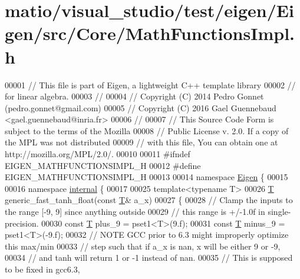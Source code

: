 \hypertarget{matio_2visual__studio_2test_2eigen_2_eigen_2src_2_core_2_math_functions_impl_8h_source}{}\section{matio/visual\+\_\+studio/test/eigen/\+Eigen/src/\+Core/\+Math\+Functions\+Impl.h}
\label{matio_2visual__studio_2test_2eigen_2_eigen_2src_2_core_2_math_functions_impl_8h_source}

\begin{DoxyCode}
00001 \textcolor{comment}{// This file is part of Eigen, a lightweight C++ template library}
00002 \textcolor{comment}{// for linear algebra.}
00003 \textcolor{comment}{//}
00004 \textcolor{comment}{// Copyright (C) 2014 Pedro Gonnet (pedro.gonnet@gmail.com)}
00005 \textcolor{comment}{// Copyright (C) 2016 Gael Guennebaud <gael.guennebaud@inria.fr>}
00006 \textcolor{comment}{//}
00007 \textcolor{comment}{// This Source Code Form is subject to the terms of the Mozilla}
00008 \textcolor{comment}{// Public License v. 2.0. If a copy of the MPL was not distributed}
00009 \textcolor{comment}{// with this file, You can obtain one at http://mozilla.org/MPL/2.0/.}
00010 
00011 \textcolor{preprocessor}{#ifndef EIGEN\_MATHFUNCTIONSIMPL\_H}
00012 \textcolor{preprocessor}{#define EIGEN\_MATHFUNCTIONSIMPL\_H}
00013 
00014 \textcolor{keyword}{namespace }\hyperlink{namespace_eigen}{Eigen} \{
00015 
00016 \textcolor{keyword}{namespace }\hyperlink{namespaceinternal}{internal} \{
00017 
00025 \textcolor{keyword}{template}<\textcolor{keyword}{typename} T>
00026 \hyperlink{group___sparse_core___module_class_eigen_1_1_triplet}{T} generic\_fast\_tanh\_float(\textcolor{keyword}{const} \hyperlink{group___sparse_core___module_class_eigen_1_1_triplet}{T}& a\_x)
00027 \{
00028   \textcolor{comment}{// Clamp the inputs to the range [-9, 9] since anything outside}
00029   \textcolor{comment}{// this range is +/-1.0f in single-precision.}
00030   \textcolor{keyword}{const} \hyperlink{group___sparse_core___module_class_eigen_1_1_triplet}{T} plus\_9 = pset1<T>(9.f);
00031   \textcolor{keyword}{const} \hyperlink{group___sparse_core___module_class_eigen_1_1_triplet}{T} minus\_9 = pset1<T>(-9.f);
00032   \textcolor{comment}{// NOTE GCC prior to 6.3 might improperly optimize this max/min}
00033   \textcolor{comment}{//      step such that if a\_x is nan, x will be either 9 or -9,}
00034   \textcolor{comment}{//      and tanh will return 1 or -1 instead of nan.}
00035   \textcolor{comment}{//      This is supposed to be fixed in gcc6.3,}

\end{DoxyCode}
